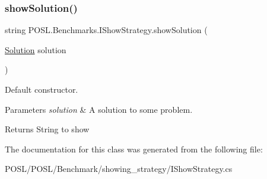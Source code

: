 \subsubsection{\texorpdfstring{show\+Solution()}{showSolution()}}
{\footnotesize\ttfamily string P\+O\+S\+L.\+Benchmarks.\+I\+Show\+Strategy.\+show\+Solution (\begin{DoxyParamCaption}\item[{\hyperlink{classPOSL_1_1Data_1_1Solution}{Solution}}]{solution }\end{DoxyParamCaption})}



Default constructor. 


\begin{DoxyParams}{Parameters}
{\em solution} & A solution to some problem. \\
\hline
\end{DoxyParams}
\begin{DoxyReturn}{Returns}
String to show 
\end{DoxyReturn}


The documentation for this class was generated from the following file\+:\begin{DoxyCompactItemize}
\item 
P\+O\+S\+L/\+P\+O\+S\+L/\+Benchmark/showing\+\_\+strategy/I\+Show\+Strategy.\+cs\end{DoxyCompactItemize}
